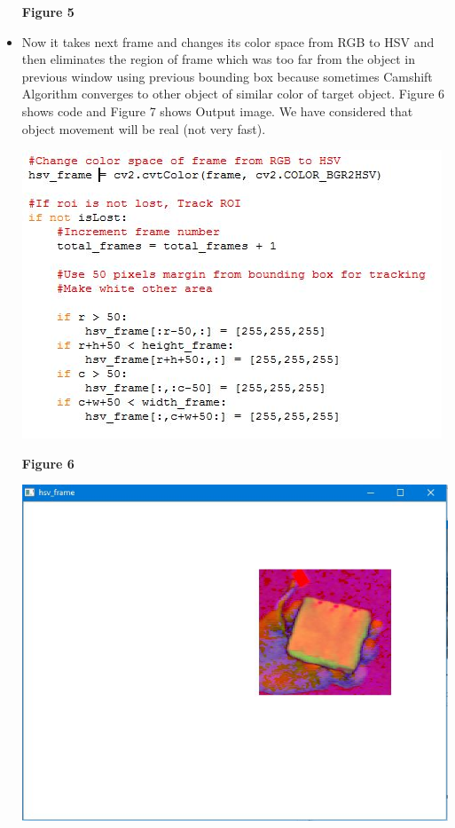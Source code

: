 \documentclass[11pt,a4paper]{article}
\begin{document}
\begin{itemize}
\begin{center}
				\end{center}
				\begin{center}
					\textbf{Figure 5}
				\end{center}
		 	\item Now it takes next frame and changes its color space from RGB to HSV and then eliminates the region of frame which was too far from the object in previous window using previous bounding box because sometimes Camshift Algorithm converges to other object of similar color of target object. Figure 6 shows code and Figure 7 shows Output image. We have considered that object movement will be real (not very fast).
			 	\begin{center}
			 		\includegraphics[scale=0.9]{frame_elimination_code.JPG}
			 	\end{center}
			 	\begin{center}
			 		\textbf{Figure 6}
			 	\end{center}
			 	\begin{center}
			 		\includegraphics[scale=0.8]{eliminated_hsv_frame.JPG}

\end{center}
\end{itemize}
\end{document}
